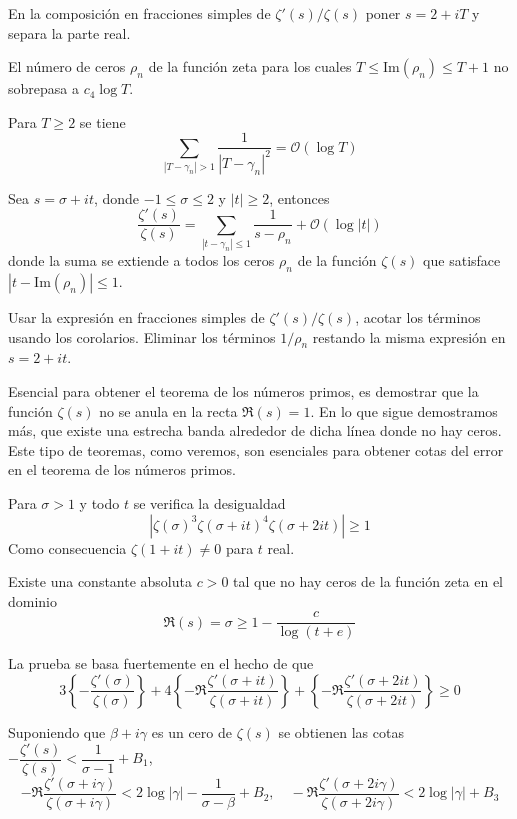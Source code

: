 \documentclass[TAN.tex]{subfiles}
\begin{document}
En la composición en fracciones simples de $ζ'(s)/ζ(s)$ poner $s = 2 + iT$ y separa la parte real.

\begin{coro}
El número de ceros $ρ_n$ de la función zeta para los cuales $T ≤ \text{Im}(ρ_n) ≤ T + 1$ no sobrepasa a $c_4 \log T$.
\end{coro}

\begin{coro}
Para $T≥2$ se tiene
\[ \sum_{|T-γ_n|>1} \frac{1}{|T-γ_n|^2} = \mathcal{O}(\log T) \]
\end{coro}

\begin{coro}
Sea $s = σ + it$, donde $-1≤σ≤2$ y $|t|≥2$, entonces
\[ \frac{ζ'(s)}{ζ(s)} = \sum_{|t-γ_n|≤1} \frac{1}{s-ρ_n} + \mathcal{O}(\log |t|) \]
donde la suma se extiende a todos los ceros $ρ_n$ de la función $ζ(s)$ que satisface $|t-\text{Im}(ρ_n)|≤1$.
\end{coro}

Usar la expresión en fracciones simples de $ζ'(s)/ζ(s)$, acotar los términos usando los corolarios. Eliminar los términos $1/ρ_n$ restando la misma expresión en $s = 2 + it$.

Esencial para obtener el teorema de los números primos, es demostrar que la función $ζ(s)$ no se anula en la recta $\Re(s)=1$. En lo que sigue demostramos más, que existe una estrecha banda alrededor de dicha línea donde no hay ceros. Este tipo de teoremas, como veremos, son esenciales para obtener cotas del error en el teorema de los números primos.

\begin{teorema}
Para $σ > 1$ y todo $t$ se verifica la desigualdad
\[ |ζ(σ)^3 ζ(σ+it)^4 ζ(σ+2it)| ≥ 1 \]
Como consecuencia $ζ(1+it) \neq 0$ para $t$ real.
\end{teorema}

\begin{teorema}
Existe una constante absoluta $c > 0$ tal que no hay ceros de la función zeta en el dominio
\[ \Re(s) = σ ≥ 1 - \frac{c}{\log(t+e)} \]
\end{teorema}

La prueba se basa fuertemente en el hecho de que
\[ 3\left\{-\frac{ζ'(σ)}{ζ(σ)}\right\} + 4 \left\{-\Re\frac{ζ'(σ+it)}{ζ(σ+it)}\right\} + \left\{-\Re\frac{ζ'(σ+2it)}{ζ(σ+2it)}\right\} ≥ 0 \]

Suponiendo que $β+iγ$ es un cero de $ζ(s)$ se obtienen las cotas $-\dfrac{ζ'(s)}{ζ(s)} < \dfrac{1}{σ-1}+B_1$,
\[ -\Re\frac{ζ'(σ+iγ)}{ζ(σ+iγ)} < 2 \log |γ| - \frac{1}{σ-β}+B_2, \quad -\Re\frac{ζ'(σ+2iγ)}{ζ(σ+2iγ)} < 2 \log |γ| + B_3 \]
\end{document}
